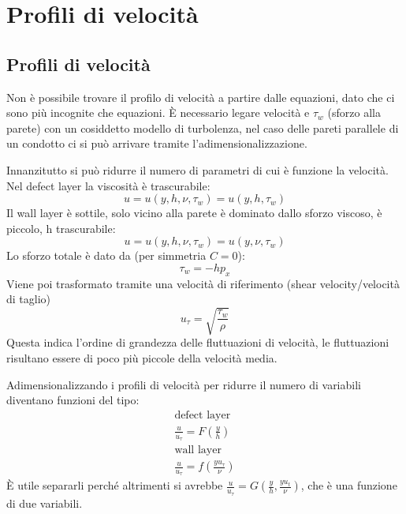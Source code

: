 %
\section{Profili di velocità}  
\subsection{Profili di velocità}
Non è possibile trovare il profilo di velocità a partire dalle equazioni, dato che ci sono più incognite che equazioni.
È necessario legare velocità e $\tau_w$ (sforzo alla parete) con un cosiddetto modello di turbolenza, nel caso delle pareti parallele di un condotto ci si può arrivare tramite l'adimensionalizzazione.

Innanzitutto si può ridurre il numero di parametri di cui è funzione la velocità.
Nel defect layer la viscosità è trascurabile:
%
	\begin{equation*}
		u = u(y, h, \nu, \tau_w) = u(y, h, \tau_w)
	\end{equation*}
%
Il wall layer è sottile, solo vicino alla parete è dominato dallo sforzo viscoso, è piccolo, h trascurabile:
%
	\begin{equation*}
		u = u(y, h, \nu, \tau_w) = u(y, \nu, \tau_w)
	\end{equation*}
%
Lo sforzo totale è dato da (per simmetria $C= 0$):
%
	\begin{equation*}
		\tau_w = - h p_x
	\end{equation*}
%
Viene poi trasformato tramite una velocità di riferimento (shear velocity/velocità di taglio)
%
	\begin{equation*}
		u_\tau = \sqrt{\frac{\tau_w}{\rho} }
	\end{equation*}
%
Questa indica l'ordine di grandezza delle fluttuazioni di velocità, le fluttuazioni risultano essere di poco più piccole della velocità media.

Adimensionalizzando i profili di velocità per ridurre il numero di variabili diventano funzioni del tipo:
%
	\begin{equation*}
		\begin{gathered}
			\text{defect layer}\\
			\frac{u}{u_\tau} = F \left( \frac{y}{h} \right)\\
			\text{wall layer}\\
			\frac{u}{u_\tau} = f\left( \frac{y u_\tau}{\nu} \right)
		\end{gathered}
	\end{equation*}
%
È utile separarli perché altrimenti si avrebbe $\frac{u}{u_\tau} = G\left( \frac{y}{h}, \frac{y u_t}{\nu} \right)$, che è una funzione di due variabili.

